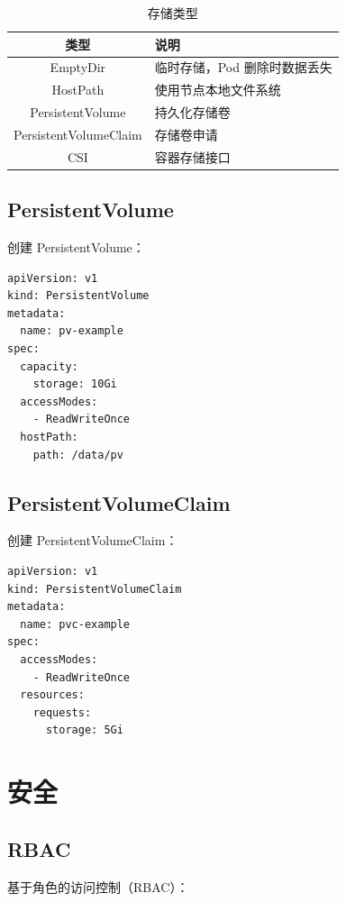 \documentclass[12pt,UTF8]{ctexbook}
\begin{document}
\begin{table}[htbp]
    \centering
    \caption{存储类型}
    \begin{tabular}{|c|p{8cm}|}
        \hline
        \textbf{类型} & \textbf{说明} \\
        \hline
        EmptyDir & 临时存储，Pod 删除时数据丢失 \\
        \hline
        HostPath & 使用节点本地文件系统 \\
        \hline
        PersistentVolume & 持久化存储卷 \\
        \hline
        PersistentVolumeClaim & 存储卷申请 \\
        \hline
        CSI & 容器存储接口 \\
        \hline
    \end{tabular}
\end{table}

\section{PersistentVolume}
\label{sec:pv}

创建 PersistentVolume：
\begin{lstlisting}
apiVersion: v1
kind: PersistentVolume
metadata:
  name: pv-example
spec:
  capacity:
    storage: 10Gi
  accessModes:
    - ReadWriteOnce
  hostPath:
    path: /data/pv
\end{lstlisting}

\section{PersistentVolumeClaim}
\label{sec:pvc}

创建 PersistentVolumeClaim：
\begin{lstlisting}
apiVersion: v1
kind: PersistentVolumeClaim
metadata:
  name: pvc-example
spec:
  accessModes:
    - ReadWriteOnce
  resources:
    requests:
      storage: 5Gi
\end{lstlisting}

\chapter{安全}
\label{chap:security}

\section{RBAC}
\label{sec:rbac}

基于角色的访问控制（RBAC）：
\end{document}
